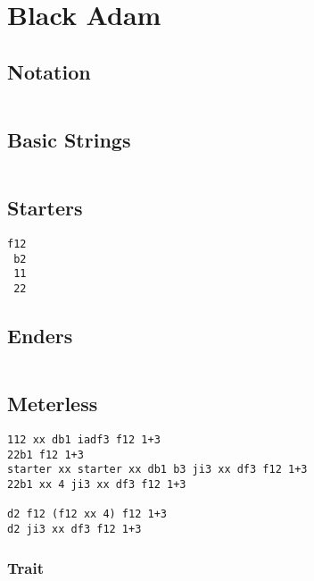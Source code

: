 \documentclass[main.tex]{subfiles}
\begin{document}
\chapter{Black Adam}

\section{Notation}
\begin{lstlisting}[language=FG]

\end{lstlisting}


\section{Basic Strings}

\begin{lstlisting}[language=FG]
\end{lstlisting}

\section{Starters}
\begin{lstlisting}[language=FG]
 f12
 b2
 11
 22
\end{lstlisting}

\section{Enders}

\begin{lstlisting}[language=FG]
\end{lstlisting}

\section{Meterless}


\begin{lstlisting}[language=FG]
112 xx db1 iadf3 f12 1+3
22b1 f12 1+3
starter xx starter xx db1 b3 ji3 xx df3 f12 1+3
22b1 xx 4 ji3 xx df3 f12 1+3

d2 f12 (f12 xx 4) f12 1+3
d2 ji3 xx df3 f12 1+3

\end{lstlisting}

\subsection{Trait}
\end{document}
